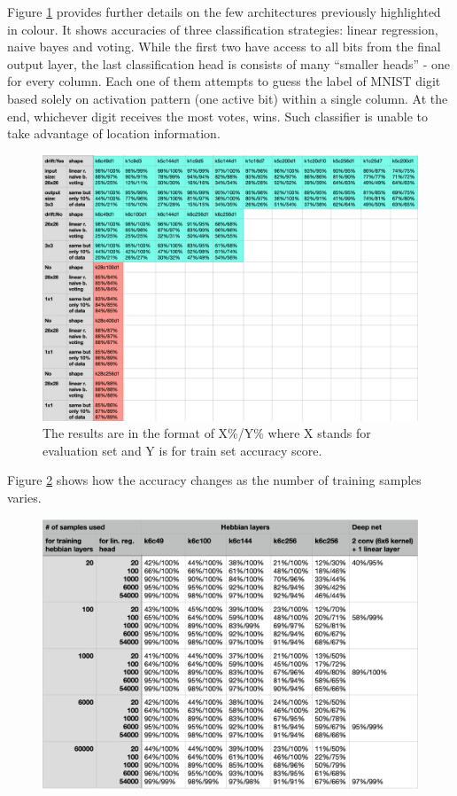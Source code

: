 \documentclass[12pt]{article}
\begin{document}
Figure \ref{fig:benchmarks_votes} provides further details on the few architectures previously highlighted in colour. It shows accuracies of three classification strategies: linear regression, naive bayes and voting. While the first two have access to all bits from the final output layer, the last classification head is consists of many ``smaller heads'' - one for every column. Each one of them attempts to guess the label of MNIST digit based solely on activation pattern (one active bit) within a single column. At the end, whichever digit receives the most votes, wins. Such classifier is unable to take advantage of location information. 

\begin{figure}[!htbp]
	\centering
	\includegraphics[width=13.8cm]{benchmarks_votes}
	\caption{The results are in the format of X\%/Y\%  where X stands for evaluation set and Y is for train set accuracy score.}
	\label{fig:benchmarks_votes}
\end{figure} 

Figure \ref{fig:lin_reg_over_sample_size} shows how the accuracy changes as the number of training samples varies.


\begin{figure}[!htbp]
	\centering
	\includegraphics[width=13.8cm]{lin_reg_over_sample_size}
	\caption{}
	\label{fig:lin_reg_over_sample_size}
\end{figure} 
\end{document}
